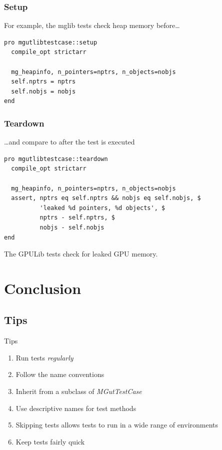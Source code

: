 \documentclass[12pt, handout]{beamer}
\begin{document}
\begin{frame}[t, fragile]
  \frametitle{Setup}

For example, the mglib tests check heap memory before\ldots
\begin{lstlisting}[basicstyle=\ttfamily\fontsize{10pt}{10pt}\selectfont]
pro mgutlibtestcase::setup
  compile_opt strictarr

  mg_heapinfo, n_pointers=nptrs, n_objects=nobjs
  self.nptrs = nptrs
  self.nobjs = nobjs
end
\end{lstlisting}
\end{frame}

\begin{frame}[t, fragile]
  \frametitle{Teardown}

\ldots and compare to after the test is executed
\begin{lstlisting}[basicstyle=\ttfamily\fontsize{10pt}{10pt}\selectfont]
pro mgutlibtestcase::teardown
  compile_opt strictarr

  mg_heapinfo, n_pointers=nptrs, n_objects=nobjs
  assert, nptrs eq self.nptrs && nobjs eq self.nobjs, $
          'leaked %d pointers, %d objects', $
          nptrs - self.nptrs, $
          nobjs - self.nobjs
end
\end{lstlisting}
The GPULib tests check for leaked GPU memory.
\end{frame}

\section{Conclusion}

\subsection{Tips}
\begin{frame}[t]{Tips}
  \begin{enumerate}
    \item Run tests {\em regularly}
    \item Follow the name conventions
    \item Inherit from a subclass of {\em MGutTestCase}
    \item Use descriptive names for test methods
    \item Skipping tests allows tests to run in a wide range of environments
    \item Keep tests fairly quick
  \end{enumerate}
\end{frame}
\end{document}
